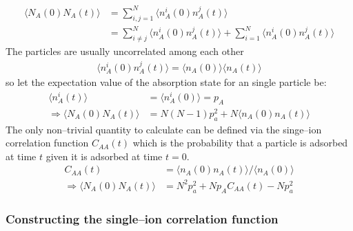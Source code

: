 \documentclass[a4paper, parskip=half]{scrartcl}
\begin{document}
\begin{align}
\langle N_A(0) N_A(t)\rangle &= \sum_{i,j = 1}^N \langle n_A^i(0) n_A^j(t)\rangle\\
&= \sum_{i \neq j}^N \langle n_A^i(0) n_A^j(t)\rangle + \sum_{i =1}^N \langle n_A^i(0) n_A^j(t)\rangle
\end{align}
The particles are usually uncorrelated among each other 
\begin{align}
\langle n_A^i(0) n_A^j(t)\rangle = \langle n_A(0) \rangle\langle n_A(t) \rangle
\end{align}
so let the expectation value of the absorption state for an single particle be:
\begin{align}
\langle n_A^i(t) \rangle &= \langle n_A^i(0) \rangle = p_A \\
\Rightarrow \langle N_A(0) N_A(t)\rangle &= N(N-1)p_a^2 + N\langle n_A(0) n_A(t)\rangle
\end{align}
The only non--trivial quantity to calculate can be defined via the singe--ion correlation function $C_{AA}(t)$ which is the probability that a particle is adsorbed at time $t$ given it is adsorbed at time $t=0$.
\begin{align}
C_{AA}(t) &= \langle n_A(0) n_A(t) \rangle / \langle n_A(0) \rangle \\
\Rightarrow \langle N_A(0) N_A(t)\rangle &= N^2p_a^2 + Np_AC_{AA}(t) - Np_a^2
\end{align}

\subsubsection{Constructing the single--ion correlation function}
\end{document}
